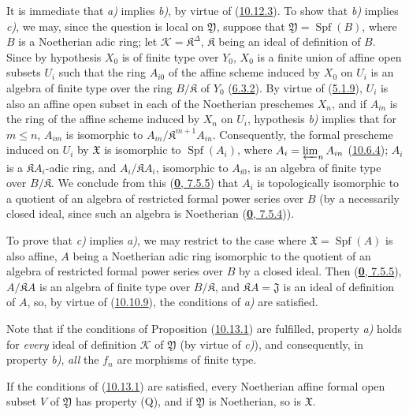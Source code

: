 It is immediate that \emph{a)} implies \emph{b)}, by virtue of
(\hyperref[I.10.12.3]{10.12.3}). To show that \emph{b)} implies \emph{c)}, we
may, since the question is local on $\mathfrak{Y}$, suppose that
$\mathfrak{Y}=\operatorname{Spf}(B)$, where $B$ is a Noetherian adic ring; let
$\mathscr{K}=\mathfrak{K}^\Delta$, $\mathfrak{K}$ being an ideal of
definition of $B$. Since by hypothesis $X_0$ is of finite type over $Y_0$,
$X_0$ is a finite union of affine open subsets $U_i$ such that the ring
$A_{i0}$ of the affine scheme induced by $X_0$ on $U_i$ is an algebra of
finite type over the ring $B/\mathfrak{K}$ of $Y_0$
(\hyperref[I.6.3.2]{6.3.2}). By virtue of
(\hyperref[I.5.1.9]{5.1.9}), $U_i$ is also an affine open subset in each
of the Noetherian preschemes $X_n$, and if $A_{in}$ is the ring of the
affine scheme induced by $X_n$ on $U_i$, hypothesis \emph{b)} implies that for
$m\leq n$, $A_{im}$ is isomorphic to
$A_{in}/\mathfrak{K}^{m+1}A_{in}$. Consequently, the formal prescheme
induced on $U_i$ by $\mathfrak{X}$ is isomorphic to $\operatorname{Spf}(A_i)$,
where $A_i=\varprojlim_n A_{in}$ (\hyperref[I.10.6.4]{10.6.4}); $A_i$ is a
$\mathfrak{K}A_i$-adic ring, and $A_i/\mathfrak{K}A_i$, isomorphic to
$A_{i0}$, is an algebra of finite type over $B/\mathfrak{K}$. We conclude
from this (\hyperref[0.7.5.5]{\textbf{0}, 7.5.5}) that $A_i$ is topologically
isomorphic to a quotient of an algebra of restricted formal power series
over $B$ (by a necessarily closed ideal, since such an algebra is Noetherian
(\hyperref[0.7.5.4]{\textbf{0}, 7.5.4})).

To prove that \emph{c)} implies \emph{a)}, we may restrict to the case where
$\mathfrak{X}=\operatorname{Spf}(A)$ is also affine, $A$ being a Noetherian
adic ring isomorphic to the quotient of an algebra of restricted formal
power series over $B$ by a closed ideal. Then
(\hyperref[0.7.5.5]{\textbf{0}, 7.5.5}), $A/\mathfrak{K}A$ is an algebra of finite
type over $B/\mathfrak{K}$, and $\mathfrak{K}A=\mathfrak{J}$ is an ideal of
definition of $A$, so, by virtue of
(\hyperref[I.10.10.9]{10.10.9}), the conditions of \emph{a)} are satisfied.

Note that if the conditions of Proposition
(\hyperref[I.10.13.1]{10.13.1}) are fulfilled, property \emph{a)} holds
for \emph{every} ideal of definition $\mathscr{K}$ of
$\mathfrak{Y}$ (by virtue of \emph{c)}), and consequently, in property \emph{b)},
\emph{all} the $f_n$ are morphisms of finite type.

\begin{corollary}[10.13.2]
\label{I.10.13.2}
If the conditions of \textup{(\hyperref[I.10.13.1]{10.13.1})} are satisfied,
every Noetherian affine formal open subset $V$ of $\mathfrak{Y}$ has
property \textup{(Q)}, and if $\mathfrak{Y}$ is Noetherian, so is
$\mathfrak{X}$.
\end{corollary}

